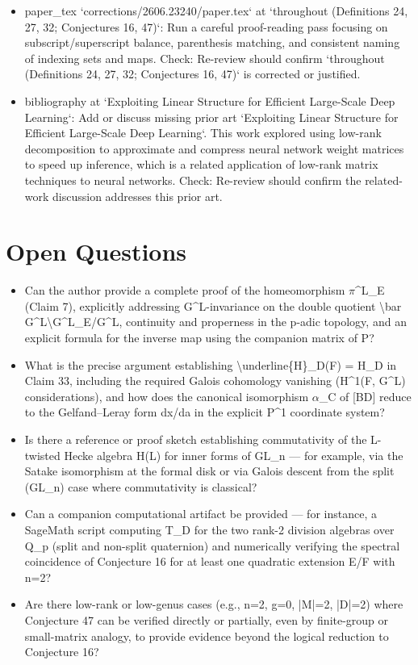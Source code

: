 \documentclass[11pt]{article}
\begin{document}
\begin{itemize}[leftmargin=*]
  \item [open] paper\_tex `corrections/2606.23240/paper.tex` at `throughout (Definitions 24, 27, 32; Conjectures 16, 47)`: Run a careful proof-reading pass focusing on subscript/superscript balance, parenthesis matching, and consistent naming of indexing sets and maps. Check: Re-review should confirm `throughout (Definitions 24, 27, 32; Conjectures 16, 47)` is corrected or justified.
  \item [open] bibliography at `Exploiting Linear Structure for Efficient Large-Scale Deep Learning`: Add or discuss missing prior art `Exploiting Linear Structure for Efficient Large-Scale Deep Learning`. This work explored using low-rank decomposition to approximate and compress neural network weight matrices to speed up inference, which is a related application of low-rank matrix techniques to neural networks. Check: Re-review should confirm the related-work discussion addresses this prior art.
\end{itemize}

\section*{Open Questions}
\begin{itemize}[leftmargin=*]
  \item Can the author provide a complete proof of the homeomorphism \ensuremath{\pi}\^{}L\_E (Claim 7), explicitly addressing G\^{}L-invariance on the double quotient \textbackslash{}bar G\^{}L\textbackslash{}G\^{}L\_E/G\^{}L, continuity and properness in the p-adic topology, and an explicit formula for the inverse map using the companion matrix of P?
  \item What is the precise argument establishing \textbackslash{}underline\{H\}\_D(F) = H\_D in Claim 33, including the required Galois cohomology vanishing (H\^{}1(F, G\^{}L) considerations), and how does the canonical isomorphism \ensuremath{\alpha}\_C of [BD] reduce to the Gelfand--Leray form dx/da in the explicit P\^{}1 coordinate system?
  \item Is there a reference or proof sketch establishing commutativity of the L-twisted Hecke algebra H(L) for inner forms of GL\_n --- for example, via the Satake isomorphism at the formal disk or via Galois descent from the split (GL\_n) case where commutativity is classical?
  \item Can a companion computational artifact be provided --- for instance, a SageMath script computing T\_D for the two rank-2 division algebras over Q\_p (split and non-split quaternion) and numerically verifying the spectral coincidence of Conjecture 16 for at least one quadratic extension E/F with n=2?
  \item Are there low-rank or low-genus cases (e.g., n=2, g=0, |M|=2, |D|=2) where Conjecture 47 can be verified directly or partially, even by finite-group or small-matrix analogy, to provide evidence beyond the logical reduction to Conjecture 16?
\end{itemize}
\end{document}
